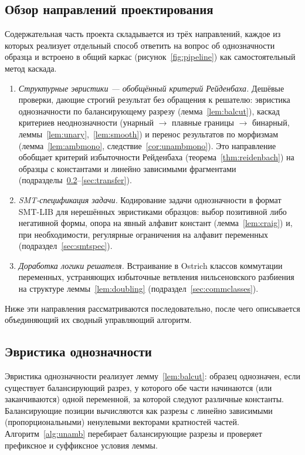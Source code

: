 \documentclass[14pt, russian]{scrartcl}
\begin{document}
\subsection{Обзор направлений проектирования}
\label{sec:directions}

Содержательная часть проекта складывается из трёх направлений, каждое из которых
реализует отдельный способ ответить на вопрос об однозначности образца и встроено в
общий каркас (рисунок~\ref{fig:pipeline}) как самостоятельный метод каскада.

\begin{enumerate}
\item \textit{Структурные эвристики --- обобщённый критерий Рейденбаха.} Дешёвые проверки,
  дающие строгий результат без обращения к решателю: эвристика однозначности по
  балансирующему разрезу (лемма~\ref{lem:balcut}), каскад критериев неоднозначности
  (унарный $\to$ плавные границы $\to$ бинарный, леммы~\ref{lem:unary},~\ref{lem:smooth})
  и перенос результатов по морфизмам (лемма~\ref{lem:ambmono},
  следствие~\ref{cor:unambmono}). Это направление обобщает критерий избыточности
  Рейденбаха (теорема~\ref{thm:reidenbach}) на образцы с константами и линейно зависимыми
  фрагментами (подразделы~\ref{sec:unamb-design}--\ref{sec:transfer}).
\item \textit{SMT-спецификация задачи.} Кодирование задачи однозначности в формат
  SMT-LIB для нерешённых эвристиками образцов: выбор позитивной либо негативной формы,
  опора на явный алфавит констант (лемма~\ref{lem:craig}) и, при необходимости,
  регулярные ограничения на алфавит переменных (подраздел~\ref{sec:smtspec}).
\item \textit{Доработка логики решателя.} Встраивание в Ostrich классов коммутации
  переменных, устраняющих избыточные ветвления нильсеновского разбиения на структуре
  леммы~\ref{lem:doubling} (подраздел~\ref{sec:commclasses}).
\end{enumerate}

Ниже эти направления рассматриваются последовательно, после чего описывается
объединяющий их сводный управляющий алгоритм.

\subsection{Эвристика однозначности}
\label{sec:unamb-design}

Эвристика однозначности реализует лемму~\ref{lem:balcut}: образец однозначен, если
существует балансирующий разрез, у которого обе части начинаются (или заканчиваются)
одной переменной, за которой следуют различные константы. Балансирующие позиции
вычисляются как разрезы с линейно зависимыми (пропорциональными) ненулевыми векторами
кратностей частей. Алгоритм~\ref{alg:unamb} перебирает балансирующие разрезы и
проверяет префиксное и суффиксное условия леммы.
\end{document}
